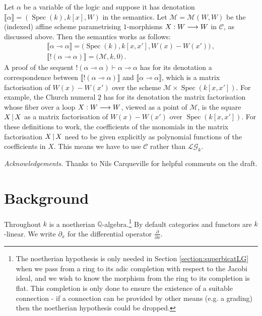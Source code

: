 \documentclass[english,letter paper,12pt,leqno]{article}
\theoremstyle{example}
\numberwithin{equation}{section}
\def\LG{\mathcal{LG}}
\def\L{\mathcal{C}}
\DeclareMathOperator{\Spec}{Spec}
\begin{document}
Let $\alpha$ be a variable of the logic and suppose it has denotation $\llbracket \alpha \rrbracket = (\Spec(k), k[x], W)$ in the semantics. Let $\mathscr{M} = \mathscr{M}(W,W)$ be the (indexed) affine scheme parametrising $1$-morphisms $X: W \longrightarrow W$ in $\L$, as discussed above. Then the semantics works as follows:
\begin{gather*}
\llbracket \alpha \multimap \alpha \rrbracket = \big(\Spec(k), k[x,x'], W(x) - W(x') \big)\,,\\
\llbracket {!}( \alpha \multimap \alpha ) \rrbracket = \big( \mathscr{M}, k, 0 \big)\,.
\end{gather*}
A proof of the sequent ${!}(\alpha \multimap \alpha) \vdash \alpha \multimap \alpha$ has for its denotation a correspondence between $\llbracket {!}( \alpha \multimap \alpha ) \rrbracket$ and $\llbracket \alpha \multimap \alpha \rrbracket$, which is a matrix factorisation of $W(x) - W(x')$ over the scheme $\mathscr{M} \times \Spec(k[x,x'])$. For example, the Church numeral $\underline{2}$ has for its denotation the matrix factorisation whose fiber over a loop $X: W \longrightarrow W$, viewed as a point of $\mathscr{M}$, is the square $X \,|\, X$ as a matrix factorisation of $W(x) - W(x')$ over $\Spec(k[x,x'])$. For these definitions to work, the coefficients of the monomials in the matrix factorisation $X \,|\, X$ need to be given explicitly as polynomial functions of the coefficients in $X$. This means we have to use $\L$ rather than $\LG_k$.

\medskip

\emph{Acknowledgements.} Thanks to Nils Carqueville for helpful comments on the draft.%

\section{Background}\label{section:background}

Throughout $k$ is a noetherian $\mathbb{Q}$-algebra.\footnote{The noetherian hypothesis is only needed in Section \ref{section:superbicatLG} when we pass from a ring to its adic completion with respect to the Jacobi ideal, and we wish to know the morphism from the ring to its completion is flat. This completion is only done to ensure the existence of a suitable connection - if a connection can be provided by other means (e.g. a grading) then the noetherian hypothesis could be dropped.} By default categories and functors are $k$-linear. We write $\partial_x$ for the differential operator $\frac{\partial}{\partial x}$.
\end{document}
